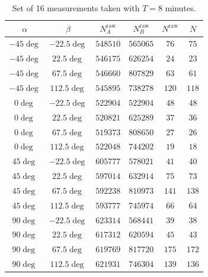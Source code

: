 \documentclass{../paper}
\begin{document}
\begin{table}
  \centering
  \begin{tabular}{cc|ccc|c}
    $\alpha$  & $\beta$    & $N_A^\text{raw}$ & $N_B^\text{raw}$ & $N^\text{raw}$ & $N$   \\
    \hline
    $-45\deg$ & $-22.5\deg$ & $548510$         & $565065$         & $76$          & $75$  \\
    $-45\deg$ & $22.5\deg$  & $546175$         & $626254$         & $24$          & $23$  \\
    $-45\deg$ & $67.5\deg$  & $546660$         & $807829$         & $63$          & $61$  \\
    $-45\deg$ & $112.5\deg$ & $545895$         & $738278$         & $120$         & $118$ \\
    $0\deg$   & $-22.5\deg$ & $522904$         & $522904$         & $48$          & $48$  \\
    $0\deg$   & $22.5\deg$  & $520821$         & $625289$         & $37$          & $36$  \\
    $0\deg$   & $67.5\deg$  & $519373$         & $808650$         & $27$          & $26$  \\
    $0\deg$   & $112.5\deg$ & $522048$         & $744202$         & $19$          & $18$  \\
    $45\deg$  & $-22.5\deg$ & $605777$         & $578021$         & $41$          & $40$  \\
    $45\deg$  & $22.5\deg$  & $597014$         & $632914$         & $75$          & $73$  \\
    $45\deg$  & $67.5\deg$  & $592238$         & $810973$         & $141$         & $138$ \\
    $45\deg$  & $112.5\deg$ & $593777$         & $745974$         & $66$          & $64$  \\
    $90\deg$  & $-22.5\deg$ & $623314$         & $568441$         & $39$          & $38$  \\
    $90\deg$  & $22.5\deg$  & $617312$         & $620594$         & $45$          & $43$  \\
    $90\deg$  & $67.5\deg$  & $619769$         & $817720$         & $175$         & $172$ \\
    $90\deg$  & $112.5\deg$ & $621931$         & $746304$         & $139$         & $136$ \\
  \end{tabular}
  \caption{Set of 16 measurements taken with $T = 8$ minutes.}
  \label{tab:16-measurements}
\end{table}
\end{document}
